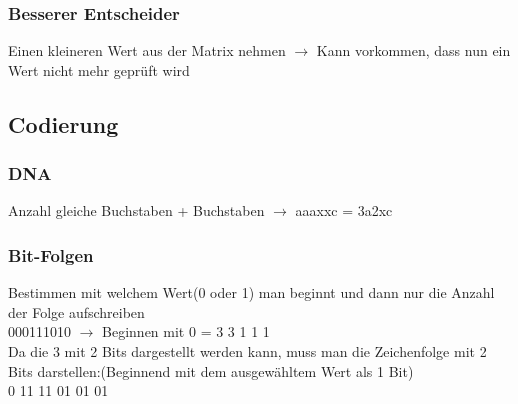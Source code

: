 \subsubsection{Besserer Entscheider}
Einen kleineren Wert aus der Matrix nehmen $\rightarrow$ Kann vorkommen, dass nun ein Wert nicht mehr geprüft wird


\subsection{Codierung}


\subsubsection{DNA}
Anzahl gleiche Buchstaben + Buchstaben $\rightarrow$ aaaxxc = 3a2xc


\subsubsection{Bit-Folgen}
Bestimmen mit welchem Wert(0 oder 1) man beginnt und dann nur die Anzahl der Folge aufschreiben\\
000111010 $\rightarrow$ Beginnen mit 0 = 3 3 1 1 1\\Da die 3 mit 2 Bits dargestellt werden kann, muss man die Zeichenfolge mit 2 Bits darstellen:(Beginnend mit dem ausgewähltem Wert als 1 Bit)\\
0 11 11 01 01 01




\vfill
$$
\columnbreak
